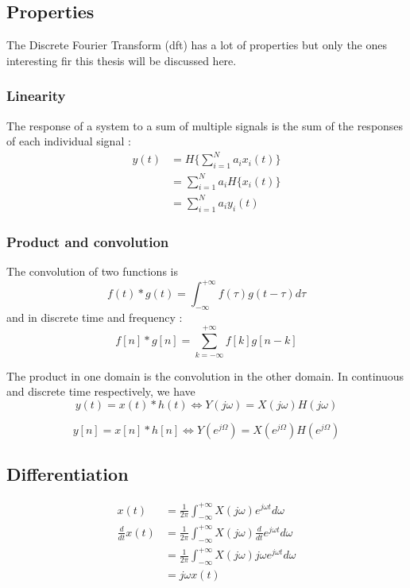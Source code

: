 \subsection{Properties}
The Discrete Fourier Transform (\acrshort{dft}) has a lot of properties but only the ones interesting fir this thesis will be discussed here.
\subsubsection{Linearity}
The response of a system to a sum of multiple signals is the sum of the responses of each individual signal :
\begin{equation}
\begin{array}{rl}
y(t) & = \displaystyle H\{\sum_{i=1}^{N}a_ix_i(t)\} \\
     & = \displaystyle \sum_{i=1}^{N}a_iH\{x_i(t)\} \\
     & = \displaystyle \sum_{i=1}^{N}a_iy_i(t)
\end{array}
\end{equation}

\subsubsection{Product and convolution}
The convolution of two functions is 
\begin{equation}f(t)*g(t)=\int_{-\infty}^{+\infty}f(\tau)g(t-\tau)d\tau\end{equation}
and in discrete time and frequency :
\begin{equation}f[n]*g[n]=\sum_{k=-\infty}^{+\infty}f[k]g[n-k]\end{equation}

The product in one domain is the convolution in the other domain. In continuous and discrete time respectively, we have
\begin{equation}
    y(t)=x(t)*h(t) \iff Y(j\omega) = X(j\omega)H(j\omega)
\end{equation}

\begin{equation}
    y[n]=x[n]*h[n] \iff Y(e^{j\Omega}) = X(e^{j\Omega})H(e^{j\Omega})
\end{equation}

\subsection{Differentiation}
\begin{equation}
\begin{array}{rl}
x(t)             & = \displaystyle \frac{1}{2\pi}\int_{-\infty}^{+\infty}X(j\omega)e^{j\omega t}d\omega \\
\frac{d}{dt}x(t) & = \displaystyle \frac{1}{2\pi}\int_{-\infty}^{+\infty}X(j\omega)\frac{d}{dt}e^{j\omega t}d\omega \\
                 & = \displaystyle \frac{1}{2\pi}\int_{-\infty}^{+\infty}X(j\omega)j\omega e^{j\omega t}d\omega \\
                 & = j\omega x(t)
\end{array}
\end{equation}


